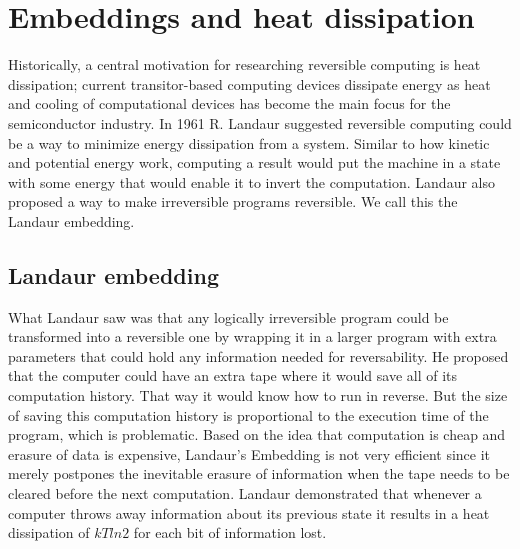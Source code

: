 

\section{Embeddings and heat dissipation}
Historically, a central motivation for researching reversible computing is heat dissipation; current transitor-based computing devices dissipate energy as heat and cooling of computational devices has become the main focus for the semiconductor industry\cite{semiconductors_valley}. In 1961 R. Landaur suggested reversible computing could be a way to minimize energy dissipation from a system\cite{Irreversibility_paper}.
Similar to how kinetic and potential energy work, computing a result would put the machine in a state with some energy that would enable it to invert the computation.
Landaur also proposed a way to make irreversible programs reversible. We call this the Landaur embedding.


\subsection{Landaur embedding}
What Landaur saw was that any logically irreversible program could be transformed into a reversible one by wrapping it in a larger program with extra parameters that could hold any information needed for reversability. He proposed that the computer could have an extra tape where it would save all of its computation history. That way it would know how to run in reverse. But the size of saving this computation history is proportional to the execution time of the program, which is problematic.
Based on the idea that computation is cheap and erasure of data is expensive, Landaur's Embedding is not very efficient since it merely postpones the inevitable erasure of information when the tape needs to be cleared before the next computation.
Landaur demonstrated that whenever a computer throws away information about its previous state it results in a heat dissipation of $kT ln 2$ for each bit of information lost.
